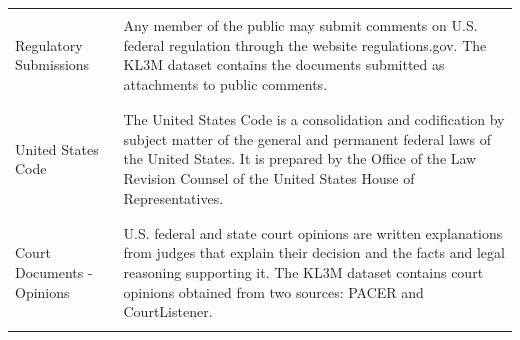 \begin{table}[h]
\begin{longtable}{ p{3cm} p{9cm} }
 \\\hline
  \\
Regulatory Submissions &
Any member of the public may submit comments on U.S. federal regulation through the website regulations.gov. The KL3M dataset contains the documents submitted as attachments to public comments. \\
 \\\hline
  \\
United States Code &
The United States Code is a consolidation and codification by subject matter of the general and permanent federal laws of the United States. It is prepared by the Office of the Law Revision Counsel of the United States House of Representatives.
\\
 \\\hline
  \\
Court Documents - Opinions &
U.S. federal and state court opinions are written explanations from judges that explain their decision and the facts and legal reasoning supporting it. The KL3M dataset contains court opinions obtained from two sources: PACER and CourtListener.  \\
 \\\hline
    \end{longtable}

\end{table}
\pagebreak


